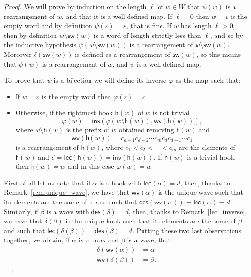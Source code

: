\documentclass[10pt,a4paper]{amsart}
\newcommand{\inv}{\mathsf{inv}}
\newcommand{\des}{\mathsf{des}}
\newcommand{\lec}{\mathsf{lec}}
\newcommand{\sw}{\mathsf{sw}}
\newcommand{\ins}{\mathsf{ins}}
\newcommand{\h}{\mathsf{h}}
\newcommand{\wv}{\mathsf{wv}}
\theoremstyle{definition}
\theoremstyle{remark}
\numberwithin{equation}{section}
\begin{document}
\setcounter{section}{5}
\setcounter{equation}{11}
\setcounter{manualconjinner}{0}
\setcounter{manualtheoreminner}{0}
\setcounter{theorem}{11}
\begin{proof}
We will prove by induction on the length $\ell$ of $w\in W$ that $\psi(w)$ is a rearrangement of $w$, and that it is a well defined map. If $\ell=0$ then $w=\varepsilon$ is the empty word and by definition $\psi(\varepsilon)=\varepsilon$, that is fine. If $w$ has length $\ell>0$, then by definition $w\setminus\sw(w)$ is a word of length strictly less than $\ell$, and so by the inductive hypothesis $\psi(w\setminus\sw(w))$ is a rearrangement of $w\setminus\sw(w)$. Moreover $\delta(\sw(w))$ is defined as a rearrangement of $\sw(w)$, so this means that $\psi(w)$ is a rearrangement of $w$, and $\psi$ is a well defined map.

To prove that $\psi$ is a bijection we will define its inverse $\varphi$ as the map such that:
\begin{itemize}
    \item If $w=\varepsilon$ is the empty word then $\varphi(\varepsilon)=\varepsilon$.
    \item Otherwise, if the rightmost hook $\h(w)$ of $w$ is not trivial
    \begin{equation}
        \varphi(w)=\ins(\varphi(w\setminus \h(w)),\wv(\h(w))),
    \end{equation}
    where $w\setminus \h(w)$ is the prefix of $w$ obtained removing $\h(w)$ and $$\wv(\h(w))=c_{d+1}c_{d+2}\cdots c_mc_dc_{d-1}\cdots c_1$$ is a rearrangement of $\h(w)$, where $c_1<c_2<\cdots<c_m$ are the elements of $\h(w)$ and $d=\lec(\h(w))=\inv(\h(w))$. If $\h(w)$ is a trivial hook, then $\h(w)=w$ and in this case $\varphi(w)=w$
\end{itemize}
First of all let us note that if $\alpha$ is a hook with $\lec(\alpha)=d$, then, thanks to Remark~\ref{rem:unique_wave}, we have that $\wv(\alpha)$ is the unique wave such that its elements are the same of $\alpha$ and such that $\des(\wv(\alpha))=\lec(\alpha)=d$. Similarly, if $\beta$ is a wave with $\des(\beta)=d$, then, thanks to Remark~\ref{lec_inverse}, we have that $\delta(\beta)$ is the unique hook such that its elements are the same of $\beta$ and such that $\lec(\delta(\beta))=\des(\beta)=d$. Putting these two last observations together, we obtain, if $\alpha$ is a hook and $\beta$ is a wave, that
\begin{align}
    \delta(\wv(\alpha))&=\alpha\label{eq:delta_wv}\\
    \wv(\delta(\beta))&=\beta.\label{eq:wv_delta}
\end{align}



\end{proof}
\end{document}
